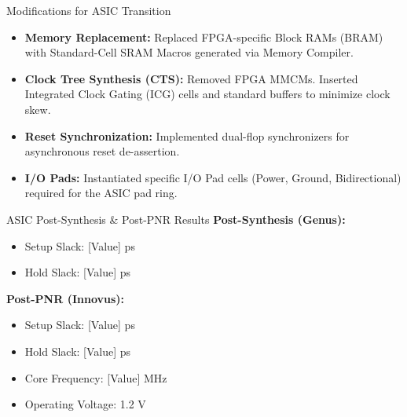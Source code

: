 \documentclass[10pt]{beamer}
\begin{document}
\begin{frame}{Modifications for ASIC Transition}
    \begin{itemize}
        \item \textbf{Memory Replacement:} Replaced FPGA-specific Block RAMs (BRAM) with Standard-Cell SRAM Macros generated via Memory Compiler.
        \item \textbf{Clock Tree Synthesis (CTS):} Removed FPGA MMCMs. Inserted Integrated Clock Gating (ICG) cells and standard buffers to minimize clock skew.
        \item \textbf{Reset Synchronization:} Implemented dual-flop synchronizers for asynchronous reset de-assertion.
        \item \textbf{I/O Pads:} Instantiated specific I/O Pad cells (Power, Ground, Bidirectional) required for the ASIC pad ring.
    \end{itemize}
\end{frame}

\begin{frame}{ASIC Post-Synthesis \& Post-PNR Results}
    \textbf{Post-Synthesis (Genus):}
    \begin{itemize}
        \item Setup Slack: [Value] ps
        \item Hold Slack: [Value] ps
    \end{itemize}
    
    \vspace{1em}
    \textbf{Post-PNR (Innovus):}
    \begin{itemize}
        \item Setup Slack: [Value] ps
        \item Hold Slack: [Value] ps
        \item Core Frequency: [Value] MHz
        \item Operating Voltage: 1.2 V
    \end{itemize}
\end{frame}
\end{document}
